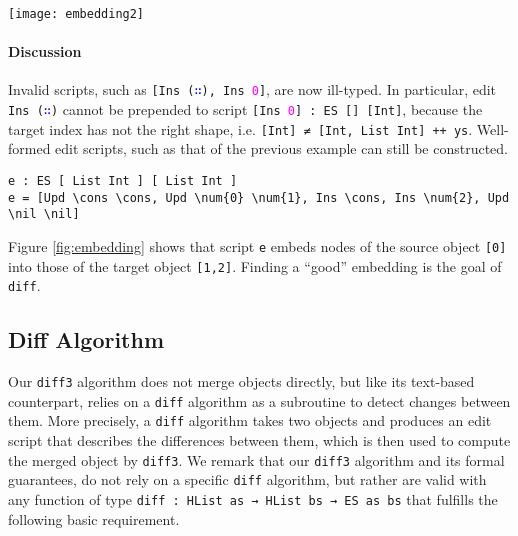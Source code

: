 \documentclass{sigplanconf}
\theoremstyle{plain}
\newcommand{\nil}{\textcolor{blue}{\texttt{[]}}}
\newcommand{\cons}{\texttt{(\textcolor{blue}{∷})}}
\newcommand{\num}[1]{\textcolor{magenta}{\texttt{#1}}}
\begin{document}
\begin{figure*}[!t]
\centering
\texttt{[image: embedding2]}
\caption{The embedding induced by \texttt{[Upd \cons\ \cons, Upd \num{0}\ \num{1}, Ins \cons, Ins \num{2}, Upd \nil\ \nil]}}
\label{fig:embedding}
\end{figure*}

\paragraph{Discussion}
Invalid scripts, such as \texttt{[Ins \cons , Ins \num{0}]}, are now
ill-typed.
%
In particular, edit \texttt{Ins \cons} cannot be
prepended to script \texttt{[Ins \num{0}] : ES [] [Int]},
because the target index has not the right shape, i.e. \texttt{[Int] ≠
  [Int, List Int] ++ ys}.
%
Well-formed edit scripts, such as that of the previous example can
still be constructed.
\begin{Verbatim}[commandchars=\\\{\}]
e : ES [ List Int ] [ List Int ]
e = [Upd \cons \cons, Upd \num{0} \num{1}, Ins \cons, Ins \num{2}, Upd \nil \nil]
\end{Verbatim}
Figure \ref{fig:embedding} shows that script \texttt{e} embeds nodes of 
the source object \texttt{[0]} into those of the target object \texttt{[1,2]}.
%
Finding a ``good'' embedding is the goal of \texttt{diff}.

\subsection{Diff Algorithm}
\label{subsec:diff-algo}
Our \texttt{diff3} algorithm does not merge objects directly, but like
its text-based counterpart, relies on a \texttt{diff} algorithm
as a subroutine to detect changes between them.
%
More precisely, a \texttt{diff} algorithm takes two objects and produces
an edit script that describes the differences between them, which is
then used to compute the merged object by \texttt{diff3}.
%
We remark that our \texttt{diff3} algorithm and its formal guarantees,
do not rely on a specific \texttt{diff} algorithm, but rather are
valid with any function of type \texttt{diff : HList as → HList bs →
  ES as bs} that fulfills the following basic requirement.
\end{document}
